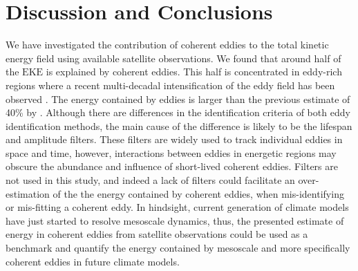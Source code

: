 \documentclass[draft,linenumbers]{agujournal2019}
\newcommand{\EKE}{\textrm{EKE}}
\begin{document}



	\section{Discussion and Conclusions}	
	\label{sec:Conclusions}

	We have investigated the contribution of coherent eddies to the total kinetic energy field using available satellite observations. 
	We found that around half of the $\EKE$ is explained by coherent eddies. 
	This half is concentrated in eddy-rich regions where a recent multi-decadal intensification of the eddy field has been observed \citep{Martinez_Kinetic_2021}. The energy contained by eddies is larger than the previous estimate of 40\% by \citet{Chelton_The_2011}.
	Although there are differences in the identification criteria of both eddy identification methods, the main cause of the difference is likely to be the lifespan and amplitude filters. 
	These filters are widely used to track individual eddies in space and time, however, interactions between eddies in energetic regions may obscure the abundance and influence of short-lived coherent eddies. 
	Filters are not used in this study, and indeed a lack of filters could facilitate an over-estimation of the the energy contained by coherent eddies, when mis-identifying or mis-fitting a coherent eddy. In hindsight, current generation of climate models have just started to resolve mesoscale dynamics, thus, the presented estimate of energy in coherent eddies from satellite observations could be used as a benchmark and quantify the energy contained by mesoscale and more specifically coherent eddies in future climate models. 
\end{document}
